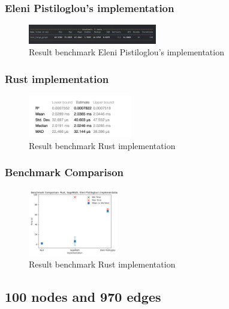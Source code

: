 \subsubsection*{Eleni Pistiloglou's implementation}
\begin{figure}[!h]
    \centering
    \includegraphics[width=0.50\textwidth]{images/benchmark/large_graph/benchmark_large_graph_python}
    \caption{Result benchmark Eleni Pistiloglou's implementation}
    \label{fig:benchmark-large-graph-python}
\end{figure}

\subsubsection*{Rust implementation}
\begin{figure}[!h]
    \centering
    \includegraphics[width=0.40\textwidth]{images/benchmark/large_graph/benchmark_large_graph_rust}
    \caption{Result benchmark Rust implementation}
    \label{fig:benchmark-large-graph-rust}
\end{figure}

\subsubsection*{Benchmark Comparison}
\begin{figure}[!h]
    \centering
    \includegraphics[width=0.35\textwidth]{images/benchmark/large_graph/benchmark_comparison_graph_100_1058}
    \caption{Result benchmark Rust implementation}
    \label{fig:benchmark-comparison-graph-100-1058}
\end{figure}


\newpage


\subsection{100 nodes and 970 edges}\label{subsec:result-for-graphs-100-970}


